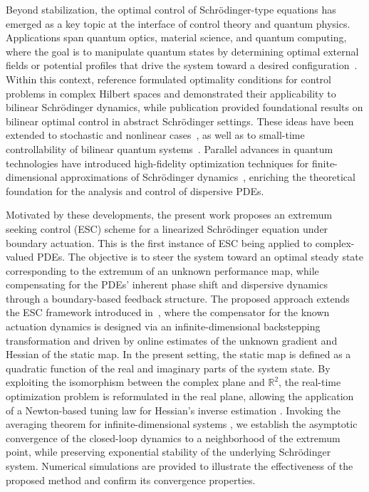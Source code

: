 \documentclass[letterpaper, 10 pt, conference]{ieeeconf}  %
\begin{document}
Beyond stabilization, the optimal control of Schrödinger-type equations has emerged as a key topic at the interface of control theory and quantum physics. Applications span quantum optics, material science, and quantum computing, where the goal is to manipulate quantum states by determining optimal external fields or potential profiles that drive the system toward a desired configuration~\cite{Yildiz2001,Breckner2021}. Within this context, reference \cite{AronnaBonnansKroner2016} formulated optimality conditions for control problems in complex Hilbert spaces and demonstrated their applicability to bilinear Schrödinger dynamics, while publication \cite{Ito2007} provided foundational results on bilinear optimal control in abstract Schrödinger settings. These ideas have been extended to stochastic and nonlinear cases~\cite{CuiLiuZhou2023,Wang2018}, as well as to small-time controllability of bilinear quantum systems~\cite{Chambrion2023}. Parallel advances in quantum technologies have introduced high-fidelity optimization techniques for finite-dimensional approximations of Schrödinger dynamics~\cite{Koch2022,DeKeijzer2025}, enriching the theoretical foundation for the analysis and control of dispersive PDEs.

Motivated by these developments, the present work proposes an extremum seeking control (ESC) scheme for a linearized Schrödinger equation under boundary actuation. This is the first instance of ESC being applied to complex-valued PDEs. The objective is to steer the system toward an optimal steady state corresponding to the extremum of an unknown performance map, while compensating for the PDEs' inherent phase shift and dispersive dynamics through a boundary-based feedback structure. The proposed approach extends the ESC framework introduced in~\cite{book2022}, where the compensator for the known actuation dynamics is designed via an infinite-dimensional backstepping transformation and driven by online estimates of the unknown gradient and Hessian of the static map. In the present setting, the static map is defined as a quadratic function of the real and imaginary parts of the system state. By exploiting the isomorphism between the complex plane and $\mathbb{R}^2$, the real-time optimization problem is reformulated in the real plane, allowing the application of a Newton-based tuning law for Hessian's inverse estimation \cite{Ghaffari2011MultivariableNE}. Invoking the averaging theorem for infinite-dimensional systems \cite{Hale1990}, we establish the asymptotic convergence of the closed-loop dynamics to a neighborhood of the extremum point, while preserving exponential stability of the underlying Schrödinger system. Numerical simulations are provided to illustrate the effectiveness of the proposed method and confirm its convergence properties.
\end{document}
